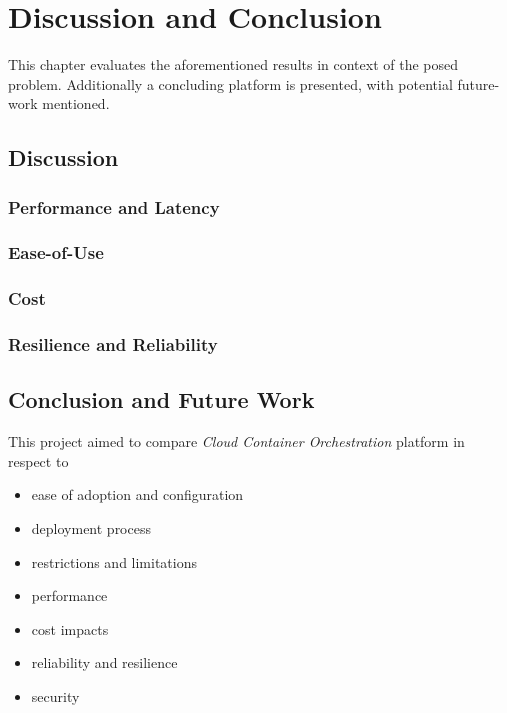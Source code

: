 \part{Discussion and Conclusion}

This chapter evaluates the aforementioned results in context of the posed problem.
Additionally a concluding platform is presented, with potential future-work mentioned.

\chapter{Discussion}

\section{Performance and Latency}
\section{Ease-of-Use}

\section{Cost}

\section{Resilience and Reliability}

\chapter{Conclusion and Future Work}

This project aimed to compare \emph{Cloud Container Orchestration} platform in respect to
\begin{itemize}
  \item ease of adoption and configuration
  \item deployment process
  \item restrictions and limitations
  \item performance
  \item cost impacts
  \item reliability and resilience
  \item security
\end{itemize}

